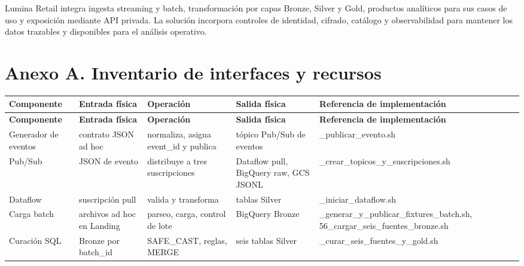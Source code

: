 \documentclass[11pt]{article}
\begin{document}
Lumina Retail integra ingesta streaming y batch, transformación por capas Bronze, Silver y Gold, productos analíticos para sus casos de uso y exposición mediante API privada. La solución incorpora controles de identidad, cifrado, catálogo y observabilidad para mantener los datos trazables y disponibles para el análisis operativo.\par



\clearpage
\section*{Anexo A. Inventario de interfaces y recursos}

\begingroup\small
\begin{longtable}{@{}>{\raggedright\arraybackslash}p{}>{\raggedright\arraybackslash}p{}>{\raggedright\arraybackslash}p{}>{\raggedright\arraybackslash}p{}>{\raggedright\arraybackslash}p{}@{}}
\toprule
\textbf{Componente} & \textbf{Entrada física} & \textbf{Operación} & \textbf{Salida física} & \textbf{Referencia de implementación} \\
\midrule
\endfirsthead
\toprule
\textbf{Componente} & \textbf{Entrada física} & \textbf{Operación} & \textbf{Salida física} & \textbf{Referencia de implementación} \\
\midrule
\endhead
Generador de eventos & contrato JSON ad hoc & normaliza, asigna event\_\allowbreak{}id y publica & tópico Pub/\allowbreak{}Sub de eventos & 08\_\allowbreak{}publicar\_\allowbreak{}evento.sh \\
Pub/\allowbreak{}Sub & JSON de evento & distribuye a tres suscripciones & Dataflow pull, BigQuery raw, GCS JSONL & 05\_\allowbreak{}crear\_\allowbreak{}topicos\_\allowbreak{}y\_\allowbreak{}suscripciones.sh \\
Dataflow & suscripción pull & valida y transforma & tablas Silver & 07\_\allowbreak{}iniciar\_\allowbreak{}dataflow.sh \\
Carga batch & archivos ad hoc en Landing & parseo, carga, control de lote & BigQuery Bronze & 55\_\allowbreak{}generar\_\allowbreak{}y\_\allowbreak{}publicar\_\allowbreak{}fixtures\_\allowbreak{}batch.sh, 56\_\allowbreak{}cargar\_\allowbreak{}seis\_\allowbreak{}fuentes\_\allowbreak{}bronze.sh \\
Curación SQL & Bronze por batch\_\allowbreak{}id & SAFE\_\allowbreak{}CAST, reglas, MERGE & seis tablas Silver & 57\_\allowbreak{}curar\_\allowbreak{}seis\_\allowbreak{}fuentes\_\allowbreak{}y\_\allowbreak{}gold.sh \\

\end{longtable}
\end{document}
